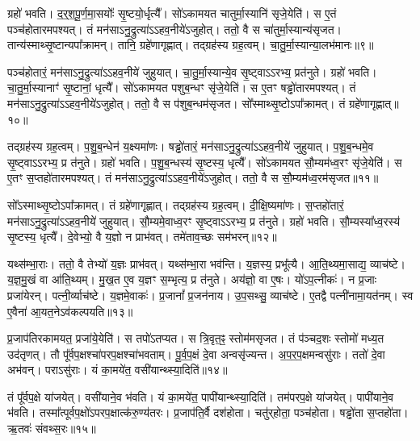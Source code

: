 ग्रहो॑ भवति।
द॒र्‌॒\mbox{}श॒पू॒र्ण॒मा॒सयोः᳚ सृ॒ष्टयो॒र्धृत्यै᳚।
सो॑ऽकामयत चातुर्मा॒स्यानि॑ सृजे॒येति॑।
स ए॒तं पञ्च॑होतारमपश्यत्।
तं मन॑सा\-ऽनु॒द्रुत्या॑\-ऽऽहव॒नीये॑\-ऽजुहोत्।
ततो॒ वै स चा॑तुर्मा॒स्यान्य॑\-सृजत।
तान्य॑स्माथ्सृ॒ष्टान्यपा᳚क्रामन्।
तानि॒ ग्रहे॑णागृह्णात्।
तद्ग्रह॑स्य ग्रह॒त्वम्।
चा॒तु॒र्मा॒स्यान्या॒लभ॑मानः॥९॥\ip

पञ्च॑होतारं॒ मन॑सा\-ऽनु॒द्रुत्या॑\-ऽऽहव॒नीये॑ जुहुयात्।
चा॒तु॒र्मा॒स्या\-न्ये॒व सृ॒ष्ट्वा\-ऽऽरभ्य॒ प्रत॑नुते।
ग्रहो॑ भवति।
चा॒तु॒र्मा॒स्यानाꣳ॑ सृ॒ष्टानां॒ धृत्यै᳚।
सो॑ऽकामयत पशुब॒न्धꣳ सृ॑जे॒येति॑।
स ए॒तꣳ षड्ढो॑तारमपश्यत्।
तं मन॑सा\-ऽनु॒द्रुत्या॑\-ऽऽहव॒नीये॑\-ऽजुहोत्।
ततो॒ वै स प॑शुब॒न्धम॑\-सृजत।
सो᳚स्माथ्सृ॒ष्टो\-ऽपा᳚क्रामत्।
तं ग्रहे॑णागृह्णात्॥१०॥\ip

तद्ग्रह॑स्य ग्रह॒त्वम्।
प॒शु॒ब॒न्धेन॑ य॒क्ष्यमा॑णः।
षड्ढो॑तारं॒ मन॑सा\-ऽनु॒द्रुत्या॑\-ऽऽहव॒नीये॑ जुहुयात्।
प॒शु॒ब॒न्धमे॒व सृ॒ष्ट्वा\-ऽऽरभ्य॒ प्र त॑नुते।
ग्रहो॑ भवति।
प॒शु॒ब॒न्धस्य॑ सृ॒ष्टस्य॒ धृत्यै᳚।
सो॑ऽकामयत सौ॒म्यम॑ध्व॒रꣳ सृ॑जे॒येति॑।
स ए॒तꣳ स॒प्तहो॑तारमपश्यत्।
तं मन॑सा\-ऽनु॒द्रुत्या॑\-ऽऽहव॒नीये॑\-ऽजुहोत्।
ततो॒ वै स सौ॒म्यम॑ध्व॒रम॑\-सृजत॥११॥\ip

सो᳚ऽस्माथ्सृ॒ष्टो\-ऽपा᳚क्रामत्।
तं ग्रहे॑णागृह्णात्।
तद्ग्रह॑स्य ग्रह॒त्वम्।
दी॒क्षि॒ष्यमा॑णः।
स॒प्तहो॑तारं॒ मन॑सा\-ऽनु॒द्रुत्या॑\-ऽऽहव॒नीये॑ जुहुयात्।
सौ॒म्यमे॒वाध्व॒रꣳ सृ॒ष्ट्वा\-ऽऽरभ्य॒ प्र त॑नुते।
ग्रहो॑ भवति।
सौ॒म्यस्या᳚ध्व॒रस्य॑ सृ॒ष्टस्य॒ धृत्यै᳚।
दे॒वेभ्यो॒ वै य॒ज्ञो न प्राभ॑वत्।
तमे॑ताव॒च्छः सम॑भरन्॥१२॥\ip

यथ्स॑म्भा॒राः।
ततो॒ वै तेभ्यो॑ य॒ज्ञः प्राभ॑वत्।
यथ्स॑म्भा॒रा भव॑न्ति।
य॒ज्ञस्य॒ प्रभू᳚त्यै।
आ॒ति॒थ्यमा॒साद्य॒ व्याच॑ष्टे।
य॒ज्ञ॒\-मु॒खं वा आ॑ति॒थ्यम्।
मु॒ख॒त ए॒व य॒ज्ञꣳ स॒म्भृत्य॒ प्र त॑नुते।
अय॑ज्ञो॒ वा ए॒षः।
यो॑ऽप॒त्नीकः॑।
न प्र॒जाः प्रजा॑येरन्।
पत्नी॒र्व्याच॑ष्टे।
य॒ज्ञमे॒वाकः॑।
प्र॒जानां᳚ प्र॒जन॑नाय।
उ॒प॒सथ्सु॒ व्याच॑ष्टे।
ए॒तद्वै पत्नी॑नामा॒यत॑नम्।
स्व ए॒वैना॑ आ॒यत॒ने\-ऽव॑कल्पयति॥१३॥\ip\anuvakamend[त॒नु॒त॒ आ॒लभ॑मानो\-ऽगृह्णाद\-सृजताभरञ्जायेर॒न्थ्षट्च॑]

प्र॒जा\-प॑तिरकामयत॒ प्रजा॑ये॒येति॑।
स तपो॑\-ऽतप्यत।
स त्रि॒वृत॒ꣴ॒ स्तोम॑म\-सृजत।
तं प॑ञ्चद॒शः स्तोमो॑ मध्य॒त उद॑तृणत्।
तौ पू᳚र्वप॒क्षश्चा॑परप॒क्षश्चा॑भवताम्।
पू॒र्व॒प॒क्षं दे॒वा अन्वसृ॑ज्यन्त।
अ॒प॒र॒प॒क्षमन्वसु॑राः।
ततो॑ दे॒वा अभ॑वन्।
पराऽसु॑राः।
यं का॒मये॑त॒ वसी॑यान्थ्स्या॒दिति॑॥१४॥\ip

तं पू᳚र्वप॒क्षे या॑जयेत्।
वसी॑याने॒व भ॑वति।
यं का॒मये॑त॒ पापी॑यान्थ्स्या॒दिति॑।
तम॑परप॒क्षे या॑जयेत्।
पापी॑याने॒व भ॑वति।
तस्मा᳚त्पूर्वप॒क्षो॑\-ऽपरप॒क्षात्क॑रु॒ण्य॑तरः।
प्र॒जा\-प॑ति॒र्वै दश॑होता।
चतु॑र्‌\mbox{}होता॒ पञ्च॑होता।
षड्ढो॑ता स॒प्तहो॑ता।
ऋ॒तवः॑ संवथ्स॒रः॥१५॥\ip

